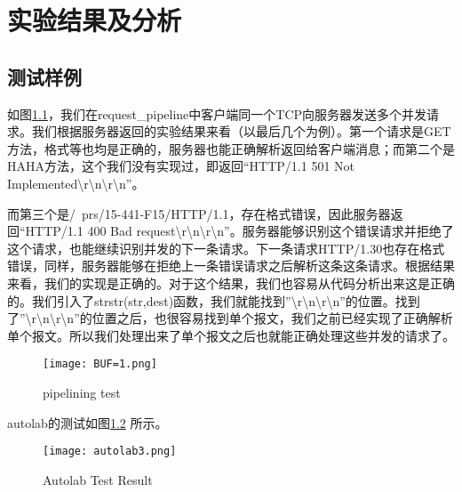 

\chapter{实验结果及分析}

\section{测试样例}

如图\ref{fig:pipelining}，我们在request\_pipeline中客户端同一个TCP向服务器发送多个并发请求。我们根据服务器返回的实验结果来看（以最后几个为例）。第一个请求是GET方法，格式等也均是正确的，服务器也能正确解析返回给客户端消息；而第二个是HAHA方法，这个我们没有实现过，即返回“HTTP/1.1 501 Not Implemented\textbackslash r\textbackslash n\textbackslash r\textbackslash n”。

而第三个是/~prs/15-441-F15/HTTP/1.1，存在格式错误，因此服务器返回“HTTP/1.1 400 Bad request\textbackslash r\textbackslash n\textbackslash r\textbackslash n”。服务器能够识别这个错误请求并拒绝了这个请求，也能继续识别并发的下一条请求。下一条请求HTTP/1.30也存在格式错误，同样，服务器能够在拒绝上一条错误请求之后解析这条这条请求。根据结果来看，我们的实现是正确的。对于这个结果，我们也容易从代码分析出来这是正确的。我们引入了strstr(str,dest)函数，我们就能找到”\textbackslash r\textbackslash n\textbackslash r\textbackslash n”的位置。找到了”\textbackslash r\textbackslash n\textbackslash r\textbackslash n”的位置之后，也很容易找到单个报文，我们之前已经实现了正确解析单个报文。所以我们处理出来了单个报文之后也就能正确处理这些并发的请求了。

\begin{figure}[htbp!]
    \centering 
    \texttt{[image: BUF=1.png]}
    \caption{pipelining test}
    \label{fig:pipelining}
\end{figure}

autolab的测试如图\ref{fig:autolab3} 所示。

\begin{figure}[htbp!]
    \centering
    \texttt{[image: autolab3.png]}
    \caption{Autolab Test Result}\label{fig:autolab3}
\end{figure}